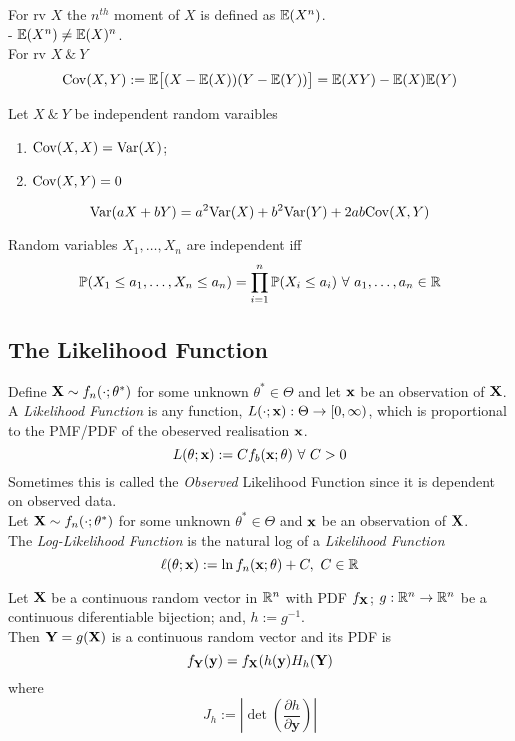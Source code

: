 \documentclass[11pt,a4paper]{article}
\begin{document}
For rv $X$ the $n^{th}$ moment of $X$ is defined as $\mathbb{E}(X^n)$.\\
\nb - $\mathbb{E}(X^n)\neq\mathbb{E}(X)^n$.\\

For rv $X\ \&\ Y$
$$\mathrm{Cov}(X,Y):=\mathbb{E}\big[(X-\mathbb{E}(X))(Y-\mathbb{E}(Y))\big]=\mathbb{E}(XY)-\mathbb{E}(X)\mathbb{E}(Y)$$

Let $X\ \&\ Y$ be independent random varaibles
\begin{enumerate}[label=\roman*)]
	\item $\mathrm{Cov}(X,X)=\mathrm{Var}(X)$;
	\item $\mathrm{Cov}(X,Y)=0$
\end{enumerate}

$$\mathrm{Var}(aX+bY)=a^2\mathrm{Var}(X)+b^2\mathrm{Var}(Y)+2ab\mathrm{Cov}(X,Y)$$

Random variables $X_1,\dots,X_n$ are independent iff
$$\prob(X_1\leq a_1,\dots,X_n\leq a_n)=\prod_{i=1}^n\prob(X_i\leq a_i)\ \forall\ a_1,\dots,a_n\in\reals$$


\subsection{The Likelihood Function}

Define $\textbf{X}\sim f_n(\cdot;\theta^*)$ for some unknown $\theta^*\in\Theta$ and let $\textbf{x}$ be an observation of $\textbf{X}$.\\
A \textit{Likelihood Function} is any function, $L(\cdot;\textbf{x}):\Theta\to[0,\infty)$, which is proportional to the PMF/PDF of the obeserved realisation $\textbf{x}$.
$$L(\theta;\x):=Cf_b(\x;\theta)\ \forall\ C>0$$
\nb Sometimes this is called the \textit{Observed} Likelihood Function since it is dependent on observed data.\\

Let $\textbf{X}\sim f_n(\cdot;\theta^*)$ for some unknown $\theta^*\in\Theta$ and $\textbf{x}$ be an observation of $\textbf{X}$.\\
The \textit{Log-Likelihood Function} is the natural log of a \textit{Likelihood Function}
$$\ell(\theta;\x):=\ln f_n(\x;\theta)+C,\ C\in\reals$$

Let $\textbf{X}$ be a continuous random vector in $\mathbb{R}^n$ with PDF $f_{\textbf{X}}$; $g:\mathbb{R}^n\to\mathbb{R}^n$ be a continuous diferentiable bijection; and, $h:=g^{-1}$.\\
Then $\textbf{Y}=g(\textbf{X})$ is a continuous random vector and its PDF is
$$f_{\textbf{Y}}(\textbf{y})=f_{\textbf{X}}(h(\textbf{y})H_h(\textbf{Y})$$
where
$$J_h:=\left|\det\left(\frac{\partial h}{\partial\textbf{y}}\right)\right|$$
\end{document}
